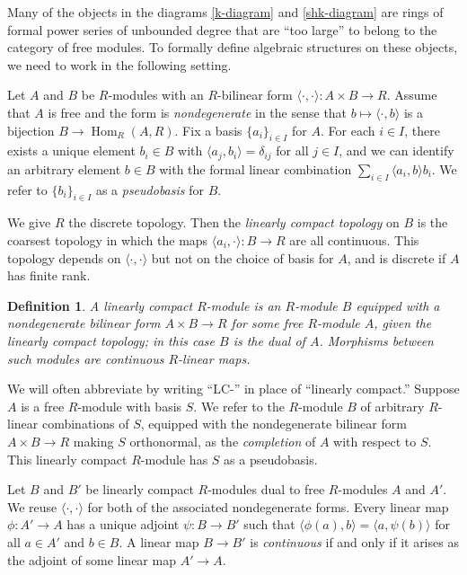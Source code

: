 \documentclass[11pt]{article}
\newtheorem{definition}[theo]{Definition}
\theoremstyle{definition}
\numberwithin{equation}{section}
\numberwithin{equation}{section}
\newcommand{\Hom}{\operatorname{Hom}}
\newcommand{\defn}[1]{{\color{darkred}\emph{#1}}}
\begin{document}
Many of the objects in the diagrams \eqref{k-diagram} and \eqref{shk-diagram} 
are rings of formal power series of unbounded degree that are ``too large'' to belong to the category of free modules. To formally define algebraic structures on these objects, we need to work in the following setting.





 


 

 

Let $A$ and $B$ be $R$-modules
with an $R$-bilinear form $\langle\cdot,\cdot\rangle : A \times B \to R$.
Assume that $A$ is free and the form
is \defn{nondegenerate} in the sense that
$b\mapsto \langle \cdot,b\rangle$ is a bijection $B\to \Hom_R(A,R)$.
%
Fix a basis $\{a_i\}_{i \in I}$ for $A$.
For each $i \in I$, there exists a unique element $b_i \in B$ with
$\langle a_j, b_i \rangle = \delta_{ij}$ for all $j \in I$,
and we can identify an arbitrary element $b \in B$
with the formal linear combination $\sum_{i \in I} \langle a_i ,b\rangle b_i$.
We refer to $\{b_i\}_{i \in I}$ as a \defn{pseudobasis} for $B$.

We give $R$ the discrete topology.
Then the \defn{linearly compact topology} \cite[\S I.2]{Dieudonne} on $B$ is the coarsest topology 
in which the maps $\langle a_i, \cdot \rangle : B \to R$ are all continuous.
This topology depends on $\langle\cdot,\cdot\rangle$ but not on the choice of basis for $A$,
and is discrete if $A$ has finite rank.




\begin{definition}
A \defn{linearly compact $R$-module} is an $R$-module $B$ equipped with a nondegenerate
bilinear form $A \times B \to R$ for some free $R$-module $A$, given the linearly compact topology;
in this case  $B$ is the \defn{dual} of $A$.
Morphisms between such modules are continuous $R$-linear maps.
\end{definition}

 
 

We will often abbreviate by writing ``LC-'' in place of ``linearly compact.''
Suppose $A$ is a free $R$-module with basis $S$.
We refer to the
$R$-module $B$ of arbitrary $R$-linear combinations of $S$,
 equipped with the nondegenerate bilinear form
$ A \times B \to R$ making $S$ orthonormal,
as the 
\defn{completion} of $A$ with respect to $S$.
This linearly compact $R$-module has $S$ as a pseudobasis.


Let $B$ and $B'$ be linearly compact $R$-modules dual to free $R$-modules $A$ and $A'$.
We reuse $\langle\cdot,\cdot\rangle$ for both of the 
associated nondegenerate forms. 
Every linear map $\phi : A' \to A$ has a unique adjoint $\psi : B\to B'$ such that 
$\langle \phi(a), b\rangle = \langle a,\psi(b)\rangle$ for all $a \in A'$ and $b \in B$.
A linear map $B \to B'$ is \defn{continuous} if and only if it arises as the adjoint 
of some linear map $A' \to A$.
\end{document}
